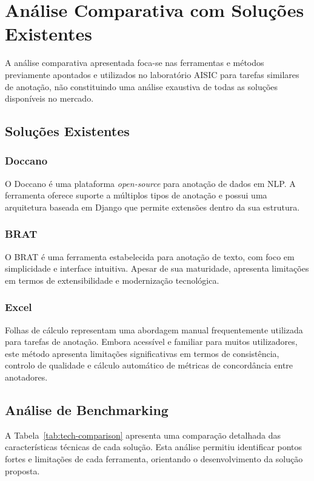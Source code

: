 \section{Análise Comparativa com Soluções Existentes}

A análise comparativa apresentada foca-se nas ferramentas e métodos previamente apontados e utilizados no laboratório AISIC para tarefas similares de anotação, não constituindo uma análise exaustiva de todas as soluções disponíveis no mercado.

\subsection{Soluções Existentes}

\subsubsection{Doccano}
O Doccano é uma plataforma \textit{open-source} para anotação de dados em NLP. A ferramenta oferece suporte a múltiplos tipos de anotação e possui uma arquitetura baseada em Django que permite extensões dentro da sua estrutura.

\subsubsection{BRAT}
O BRAT é uma ferramenta estabelecida para anotação de texto, com foco em simplicidade e interface intuitiva. Apesar de sua maturidade, apresenta limitações em termos de extensibilidade e modernização tecnológica.

\subsubsection{Excel}
Folhas de cálculo representam uma abordagem manual frequentemente utilizada para tarefas de anotação. Embora acessível e familiar para muitos utilizadores, este método apresenta limitações significativas em termos de consistência, controlo de qualidade e cálculo automático de métricas de concordância entre anotadores.

\subsection{Análise de Benchmarking}

A Tabela~\ref{tab:tech-comparison} apresenta uma comparação detalhada das características técnicas de cada solução. Esta análise permitiu identificar pontos fortes e limitações de cada ferramenta, orientando o desenvolvimento da solução proposta.

